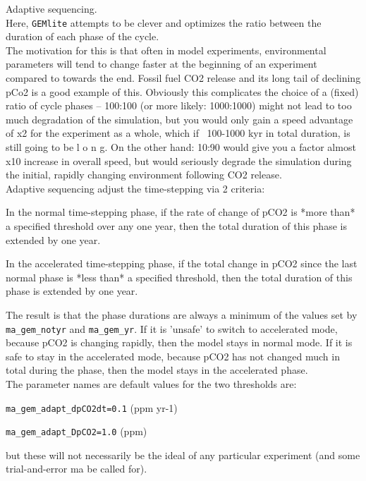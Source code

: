 \documentclass[10pt,twoside]{article}
\begin{document}
\begin{compactenum}
	\item Adaptive sequencing.
	\\Here, \texttt{GEMlite} attempts to be clever and optimizes the ratio between the duration of each phase of the cycle.
	\\The motivation for this is that often in model experiments, environmental parameters will  tend to change faster at the beginning of an experiment compared to towards the end. Fossil fuel CO2 release and its long tail of declining pCo2 is a good example of this. Obviously this complicates the choice of a (fixed) ratio of cycle phases -- 100:100 (or more likely: 1000:1000) might not lead to too much degradation of the simulation, but you would only gain a speed advantage of x2 for the experiment as a whole, which if ~100-1000 kyr in total duration, is still going to be l o n g. On the other hand: 10:90 would give you a factor almost x10 increase in overall speed, but would seriously degrade the simulation during the initial, rapidly changing environment following CO2 release.
	\\Adaptive sequencing adjust the time-stepping via 2 criteria:
\begin{compactitem}
	\item In the normal time-stepping phase, if the rate of change of pCO2 is *more than* a specified threshold over any one year, then the total duration of this phase is extended by one year.
	\item In the accelerated time-stepping phase, if the total change in pCO2 since the last normal phase is *less than* a specified threshold, then the total duration of this phase is extended by one year.
\end{compactitem}
The result is that the phase durations are always a minimum of the values set by \texttt{ma\_gem\_notyr} and \texttt{ma\_gem\_yr}. If it is 'unsafe' to switch to accelerated mode, because pCO2 is changing rapidly, then the model stays in normal mode. If it is safe to stay in the accelerated mode, because pCO2 has not changed much in total during the phase, then the model stays in the accelerated phase.
	\\The parameter names are default values for the two thresholds are:
\begin{compactitem}
	\item \texttt{ma\_gem\_adapt\_dpCO2dt=0.1} (ppm yr-1)
	\item \texttt{ma\_gem\_adapt\_DpCO2=1.0} (ppm)
\end{compactitem}
but these will not necessarily be the ideal of any particular experiment (and some trial-and-error ma be called for).

\end{compactenum}
\end{document}

